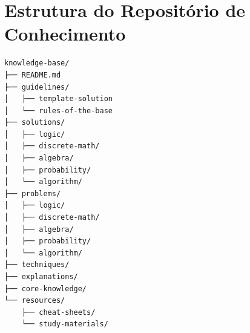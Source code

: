 \section{Estrutura do Repositório de Conhecimento}

\begin{tcolorbox}[enhanced,breakable,colback=black!2,colframe=black!40,boxrule=0.5pt,arc=3pt,left=6pt,right=6pt,top=6pt,bottom=6pt]
\begin{Verbatim}[fontsize=\small,baselinestretch=1.1]
knowledge-base/
├── README.md
├── guidelines/
│   ├── template-solution
│   └── rules-of-the-base
├── solutions/
│   ├── logic/
│   ├── discrete-math/
│   ├── algebra/
│   ├── probability/
│   └── algorithm/
├── problems/
│   ├── logic/
│   ├── discrete-math/
│   ├── algebra/
│   ├── probability/
│   └── algorithm/
├── techniques/
├── explanations/
├── core-knowledge/
└── resources/
    ├── cheat-sheets/
    └── study-materials/
\end{Verbatim}
\end{tcolorbox}

